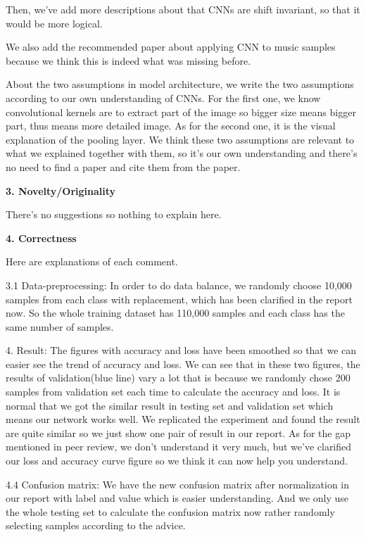 \documentclass{article}
\begin{document}
Then, we've add more descriptions about that CNNs are shift invariant, so that it would be more logical.

We also add the recommended paper about applying CNN to music samples because we think this is indeed what was missing before.

About the two assumptions in model architecture, we write the two assumptions according to our own understanding of CNNs. For the first one, we know convolutional kernels are to extract part of the image so bigger size means bigger part, thus means more detailed image. As for the second one, it is the visual explanation of the pooling layer. We think these two assumptions are relevant to what we explained together with them, so it's our own understanding and there's no need to find a paper and cite them from the paper.

\noindent \textbf{3. Novelty/Originality}

There's no suggestions so nothing to explain here.

\noindent \textbf{4. Correctness}

Here are explanations of each comment.

3.1 Data-preprocessing: In order to do data balance, we randomly choose 10,000 samples from each class with replacement, which has been clarified in the report now. So the whole training dataset has 110,000 samples and each class has the same number of samples.

4. Result: The figures with accuracy and loss have been smoothed so that we can easier see the trend of accuracy and loss. We can see that in these two figures, the results of validation(blue line) vary a lot that is because we randomly chose 200 samples from validation set each time to calculate the accuracy and loss. It is normal that we got the similar result in testing set and validation set which means our network works well. We replicated the experiment and found the result are quite similar so we just show one pair of result in our report. As for the gap mentioned in peer review, we don't understand it very much, but we've clarified our loss and accuracy curve figure so we think it can now help you understand.


4.4 Confusion matrix: We have the new confusion matrix after normalization in our report with label and value which is easier understanding. And we only use the whole testing set to calculate the confusion matrix now rather randomly selecting samples according to the advice. 
\end{document}
